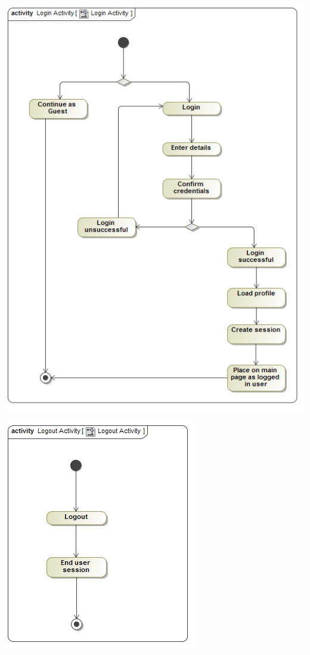 \documentclass[12pt, oneside]{article}
\begin{document}
		 \includegraphics[scale=0.4]{Activity_Diagram__Login_Activity__Login_Activity}
		 \newline
		 
		 \includegraphics[scale=0.55]{Activity_Diagram__Logout_Activity__Logout_Activity}
		 \newline
		 
\end{document}
